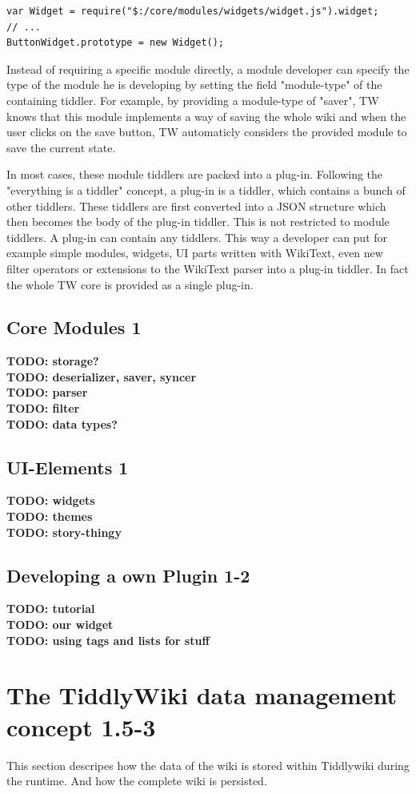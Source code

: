 \documentclass[12pt,a4paper]{article}
\newcommand{\todo}[1]{{\bf TODO: #1}\\
}
\begin{document}
\begin{lstlisting}[caption={Import other modules by using require()},label=lst:require]
var Widget = require("$:/core/modules/widgets/widget.js").widget;
// ...
ButtonWidget.prototype = new Widget();
\end{lstlisting}

Instead of requiring a specific module directly, a module developer can specify the type of the module he is developing by setting the field "module-type" of the containing tiddler.
For example, by providing a module-type of "saver", TW knows that this module implements a way of saving the whole wiki and when the user clicks on the save button, TW automaticly considers the provided module to save the current state.

In most cases, these module tiddlers are packed into a plug-in.
Following the "everything is a tiddler" concept, a plug-in is a tiddler, which contains a bunch of other tiddlers. These tiddlers are first converted into a JSON structure which then becomes the body of the plug-in tiddler.
This is not restricted to module tiddlers. A plug-in can contain any tiddlers. This way a developer can put for example simple modules, widgets, UI parts written with WikiText, even new filter operators or extensions to the WikiText parser into a plug-in tiddler. In fact the whole TW core is provided as a single plug-in.

\subsection{Core Modules 1}
\todo{storage?}
\todo{deserializer, saver, syncer}
\todo{parser}
\todo{filter}
\todo{data types?}
\subsection{UI-Elements 1}
\todo{widgets}
\todo{themes}
\todo{story-thingy}
\subsection{Developing a own Plugin 1-2}
\todo{tutorial}
\todo{our widget}
\todo{using tags and lists for stuff}
\newpage
\section{The TiddlyWiki data management concept 1.5-3}
This section descripes how the data of the wiki is stored within Tiddlywiki during the runtime. And how the complete wiki is persisted.
\end{document}
